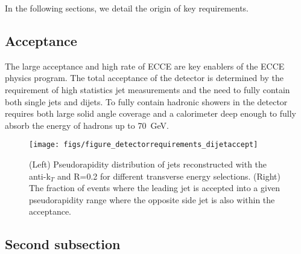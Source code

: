 In the following sections, we detail the origin of key requirements.

\subsection{Acceptance}

The large acceptance and high rate of ECCE are key enablers of the ECCE 
physics program.
The total
acceptance of the detector is determined by the requirement of high
statistics jet measurements and the need to fully contain both single
jets and dijets.  To fully contain hadronic showers in the detector
requires both large solid angle coverage and a calorimeter deep enough
to fully absorb the energy of hadrons up to 70~GeV.

\begin{figure}[hbt!]
 \begin{center}
  \hfill
  \texttt{[image: figs/figure\_detectorrequirements\_dijetaccept]}
  \caption[Pseudorapidity distribution of \pythia jets reconstructed
  with the \fastjet anti-k$_{T}$ and the fraction of events in which
  the leading and subleading jet are in the specified
  acceptance]{\label{fig:pythia_dijet_accept}(Left) Pseudorapidity
    distribution of \pythia jets reconstructed with the \fastjet
    anti-k$_{T}$ and R=0.2 for different transverse energy selections.
    (Right) The fraction of \pythia events where the leading jet is
    accepted into a given pseudorapidity range where the opposite side
    jet is also within the acceptance. }
 \end{center}
\end{figure}

\subsection{Second subsection}
